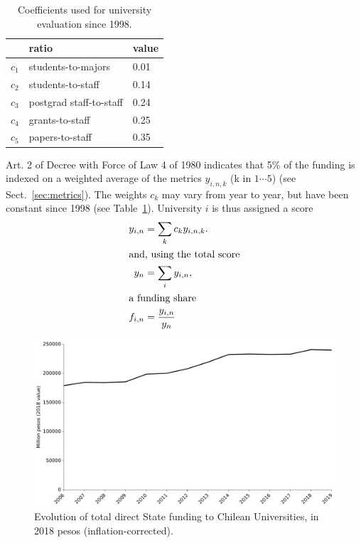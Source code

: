 \documentclass[twocolumn]{article}
\begin{document}
\begin{table}[t]
\centering
\caption{Coefficients used for university evaluation since 1998.}
\label{tab:coeff}
\begin{tabular}{lll}
\hline\hline
      & ratio                   & value\\
\hline
$c_1$ & students-to-majors      & 0.01\\
$c_2$ & students-to-staff       & 0.14\\
$c_3$ & postgrad staff-to-staff & 0.24\\
$c_4$ & grants-to-staff         & 0.25\\
$c_5$ & papers-to-staff         & 0.35\\
\hline
\end{tabular}
\end{table}


Art. 2 of Decree with Force of Law 4 of 1980 indicates that 5\% of the funding
is indexed on a weighted average of the metrics $y_{i,n,k}$ (k in $1\cdots5$)
(see Sect.~\ref{sec:metrics}). The weights $c_k$ may vary from year to year,
but have been constant since 1998 (see Table~\ref{tab:coeff}).  University $i$
is thus assigned a score
\begin{subequations}
\begin{align}
    y_{i,n}    &= \sum_k c_k y_{i,n,k}. \label{eq:y}\\
\intertext{and, using the total score}
    y_{n}      &= \sum_i y_{i,n},\\
\intertext{a funding share}
    f_{i,n}    &= \frac{y_{i,n}}{y_{n}} \label{eq:f}
\end{align}
\end{subequations}


\begin{figure}[t]
\centering
\includegraphics[width=\linewidth]{pdf/total-afd-timeseries.pdf}
\caption{Evolution of total direct State funding to Chilean Universities, in 2018
pesos (inflation-corrected).}
\label{fig:total-afd}
\end{figure}
\end{document}
